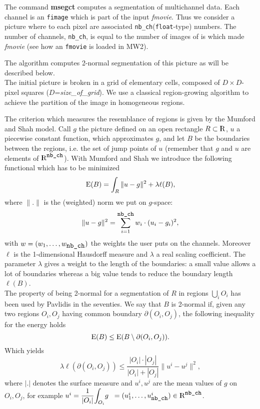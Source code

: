 \def\Disp#1{{\displaystyle #1}}
\def\Dfrac#1#2{{\displaystyle \frac{#1}{#2}}}

\def\R{{\rm I\!\!R}}
\def\NC{{\tt nb\_ch}}


The command {\bf msegct} computes a segmentation of multichannel data.
Each channel is an {\tt fimage} which is part of the input {\em fmovie}.
Thus we consider a picture where to each pixel are associated 
\NC ({\tt float}-type) numbers. The number of channels,
\NC, is equal to the number of images of is which made {\em fmovie}
(see how an {\tt fmovie} is loaded in MW2).

The algorithm computes  2-normal segmentation of this picture 
as will be described below.\\
The initial picture is broken in a grid of elementary cells, composed of
$D\times D$-pixel squares ($D$={\em size\_of\_grid}). 
We use a classical region-growing algorithm to achieve the partition of the 
image in homogeneous regions.

The criterion which measures the resemblance of regions is given by the 
Mumford and Shah model. 
Call $g$ the picture defined on an open rectangle $R\subset\R$,
$u$ a piecewise constant function, which approximates $g$, and
let $B$ be the boundaries between the regions, i.e. the set of jump points of
$u$ (remember that $g$ and $u$ are elements of $\R^{\mbox{\small \NC}}$).
With Mumford and Shah we introduce the following functional which has
to be minimized
$$ {\rm E}(B)=\int_{R} \|u-g\|^{2} + \lambda\ell(B),$$
where $\|.\|$ is the (weighted) norm we put on $g$-space:
$$\|u-g\|^{2}=\sum_{i=1}^{\mbox{\small\NC}} w_i\cdot(u_i-g_i)^2,$$
with $w=(w_1,\ldots,w_{\mbox{\NC}})$ the weights the user puts on the channels.
Moreover $\ell$ is the 1-dimensional Hausdorff measure and $\lambda$ a real
scaling coefficient. The parameter $\lambda$ gives a weight to the length
of the boundaries: a small value allows a lot of boundaries whereas a big
value tends to reduce the boundary length $\ell(B)$.\\
The property of being 2-normal for a segmentation of $R$ in regions
$\Disp{\bigcup_{i}O_{i}}$ has been used by Pavlidis in the seventies.
We say that $B$ is 2-normal if, given any two regions $O_{i},O_{j}$ having
common boundary $\partial(O_{i},O_{j})$, the following inequality for
the energy holds 
$$ {\rm E}(B) \leq {\rm E}(B\setminus\partial(O_{i},O_{j})). $$
Which yields
$$ \lambda\ell(\partial(O_{i},O_{j}))\leq\frac{|O_{i}|\cdot |O_{j}|}{|O_{i}|+|O_{j}|}\|u^{i}-u^{j}\|^{2},$$
where $|.|$ denotes the surface measure and $u^{i},u^{j}$ are the mean values
of $g$ on $O_{i},O_{j}$, for example 
$u^{i}=\Dfrac{1}{|O_{i}|}\Disp{\int_{O_{i}}}g\;\;
=(u^i_1,\ldots,u^i_{\mbox{\small\NC}}) \in \R^{\mbox{\small\NC}}$.

